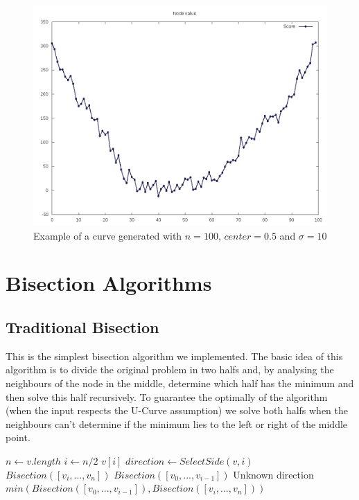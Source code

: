 \documentclass[12pt]{article}
\begin{document}
\begin{figure}[H]
\caption{Example of a curve generated with $n = 100$, $center = 0.5$ and $\sigma = 10$}
\centering
\includegraphics[scale=.5]{curve_sigma10}
\end{figure}

\newpage
\section{Bisection Algorithms}
\subsection{Traditional Bisection}
This is the simplest bisection algorithm we implemented. The basic idea of this algorithm is to divide the original problem in two halfs and, by analysing the neighbours of the node in the middle, determine which half has the minimum and then solve this half recursively. To guarantee the optimally of the algorithm (when the input respects the U-Curve assumption) we solve both halfs when the neighbours can't determine if the minimum lies to the left or right of the middle point.
\begin{algorithm}[h]
\caption{}
\begin{algorithmic}[1]
    \State $n \gets v.length$
    \State $i \gets n / 2$
        \State
        \Return $v[i]$
    \Else
        \State $direction \gets SelectSide (v, i)$
            \State
            \Return $Bisection ([v_i, ..., v_n])$
            \State
            \Return $Bisection ([v_0, ..., v_{i - 1}])$
        \Else \Comment Unknown direction
            \State
            \Return $min (Bisection ([v_0, ..., v_{i - 1}]), Bisection ([v_i, ..., v_n]))$
        \EndIf
    \EndIf

\EndProcedure
\end{algorithmic}
\end{algorithm}
\end{document}
